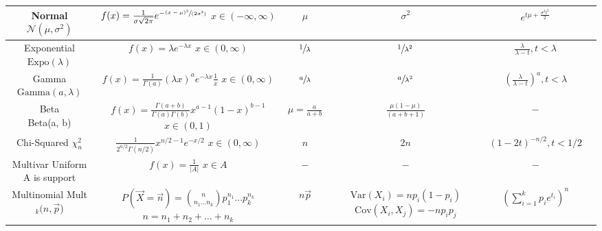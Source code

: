 \documentclass[10pt,landscape]{article}
\theoremstyle{definition}
\newcommand{\var}{\textrm{Var}}
\newcommand{\cov}{\textrm{Cov}}
\newcommand{\N}{\mathcal{N}}
\newcommand{\Beta}{\textrm{Beta}}
\newcommand{\Gam}{\textrm{Gamma}}
\newcommand{\Expo}{\textrm{Expo}}
\newcommand{\Mult}{\textrm{Mult}}
\begin{document}
\begin{sidewaystable}
\begin{center}
\begin{tabular}{cccccc}
    \hline
    \shortstack{Normal \\ $\N(\mu, \sigma^2)$} & \shortstack{$f(x) = \frac{1}{\sigma \sqrt{2\pi}} e^{-\sfrac{(x - \mu)^2}{(2 \sigma^2)}}$ \\ $x \in (-\infty, \infty)$} & $\mu$  & $\sigma^2$ & $e^{t\mu + \frac{\sigma^2t^2}{2}}$\\
    \hline
    \shortstack{Exponential \\ $\Expo(\lambda)$} & \shortstack{$f(x) = \lambda e^{-\lambda x}$\\$ x \in (0, \infty)$} & $\sfrac{1}{\lambda}$  & $\sfrac{1}{\lambda^2}$ & $\frac{\lambda}{\lambda - t}, t < \lambda$\\
    \hline
    \shortstack{Gamma \\ $\Gam(a, \lambda)$} & \shortstack{$f(x) = \frac{1}{\Gamma(a)}(\lambda x)^ae^{-\lambda x}\frac{1}{x}$\\$ x \in (0, \infty)$} & $\sfrac{a}{\lambda}$  & $\sfrac{a}{\lambda^2}$ & $\left(\frac{\lambda}{\lambda - t}\right)^a, t < \lambda$\\
    \hline
    \shortstack{Beta \\ \Beta(a, b)} & \shortstack{$f(x) = \frac{\Gamma(a+b)}{\Gamma(a)\Gamma(b)}x^{a-1}(1-x)^{b-1}$\\$x \in (0, 1) $} & $\mu = \frac{a}{a + b}$  & $\frac{\mu(1-\mu)}{(a + b + 1)}$ & $-$\\
    \hline
    \shortstack{Chi-Squared \\ $\chi_n^2$} & \shortstack{$\frac{1}{2^{n/2}\Gamma(n/2)}x^{n/2 - 1}e^{-x/2}$\\$x \in (0, \infty) $} & $n$  & $2n$ & $(1 - 2t)^{-n/2}, t < 1/2$\\
    \hline
    \hline
    \shortstack{Multivar Uniform \\ A is support} & \shortstack{$f(x) = \frac{1}{|A|}$\\$  x \in A $} & $-$  & $-$ & $-$\\
    \hline
    \shortstack{Multinomial \\ \Mult$_k(n, \vec{p}$)} & \shortstack{$P(\vec{X} = \vec{n}) = {n \choose n_1\dots n_k}p_1^{n_1}\dots p_k^{n_k}$ \\ $n = n_1 + n_2 + \dots + n_k$} & $n\vec{p}$ & \shortstack{$\var(X_i) = np_i(1-p_i)$ \\ $\cov(X_i, X_j) = -np_ip_j$} & $\left(\sum_{i=1}^k p_ie^{t_i}\right)^n$ \\
    \hline
    \hline

    \end{tabular}


\end{center}
\end{sidewaystable}
\end{document}
